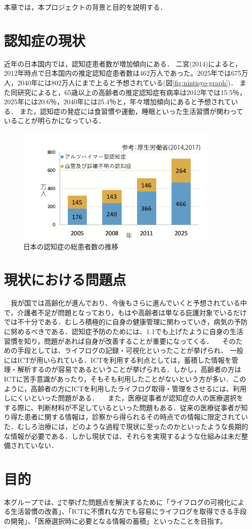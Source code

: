 \documentclass[../report]{subfiles}
\begin{document}
本章では，本プロジェクトの背景と目的を説明する．

\section{認知症の現状} \label{sec:genzyou}
近年の日本国内では，認知症患者数が増加傾向にある．
二宮(2014)によると，2012年時点で日本国内の推定認知症患者数は462万人であった。2025年では675万人，2040年には802万人にまで上ると予想されている(図\ref{fig:nintisyo-graph})．
また同研究によると，65歳以上の高齢者の推定認知症有病率は2012年では15.5％，2025年には20.6％，2040年には25.4％と，年々増加傾向にあると予想されている．
また，認知症の発症には食習慣や運動，睡眠といった生活習慣が関わっていることが明らかになっている\cite{seikatsu}．
\begin{figure}[htbp]
    \begin{center}
        \includegraphics[width=10cm]{imgs/ninchisyo-graph.png}
        \caption{日本の認知症の総患者数の推移}
        \label{fig:ninchisyo-graph}
    \end{center}
\end{figure}

\section{現状における問題点} \label{sec:mondai}
　我が国では高齢化が進んでおり、今後もさらに進んでいくと予想されている中で，介護者不足が問題となっており，もはや高齢者は単なる庇護対象でいるだけでは不十分である\cite{kaigo}．むしろ積極的に自身の健康管理に関わっていき，病気の予防に努めるべきである．認知症予防のためには、1.1でも上げたように自身の生活習慣を知り，問題があれば自身が改善することが重要になってくる．
　そのための手段としては、ライフログの記録・可視化といったことが挙げられ\cite{lifelog}、 一般にはICTが用いられている．ICTを利用する利点としては，蓄積した情報を管理・解析するのが容易であるということが挙げられる．しかし，高齢者の方はICTに苦手意識があったり，そもそも利用したことがないという方が多い．このように，高齢者の方にICTを利用したライフログ取得・管理をさせるには、利用しにくいといった問題がある．
　また，医療従事者が認知症の人の医療選択をする際に、判断材料が不足しているといった問題もある．従来の医療従事者が知り得た患者に関する情報は，診察から得られるその時点での情報に限定されていた．むしろ治療には，どのような過程で現状に至ったのかといったような長期的な情報が必要である．しかし現状では、それらを実現するような仕組みは未だ整備されていない．

\section{目的}
本グループでは、\ref{sec:mondai}で挙げた問題点を解決するために「ライフログの可視化による生活習慣の改善」、「ICTに不慣れな方でも容易にライフログを取得できる手段の開発」、「医療選択時に必要となる情報の蓄積」といったことを目指す。
\end{document}
